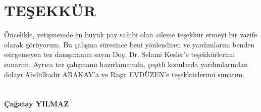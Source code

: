 \chapter{TEŞEKKÜR}

Öncelikle, yetişmemde en büyük pay sahibi olan aileme teşekkür etmeyi bir vazife olarak görüyorum.
Bu çalışma süresince beni yönlendiren ve yardımlarını benden esirgemeyen tez danışmanım sayın Doç. Dr. Selami Kesler'e teşekkürlerimi sunarım. Ayrıca tez çalışmamı hazırlamamda, çeşitli konularda yardımlarından dolayı Abdülkadir ABAKAY'a ve Raşit EVDÜZEN'e teşekkürlerimi sunarım.
\\\\\\
\textbf{Çağatay YILMAZ}
